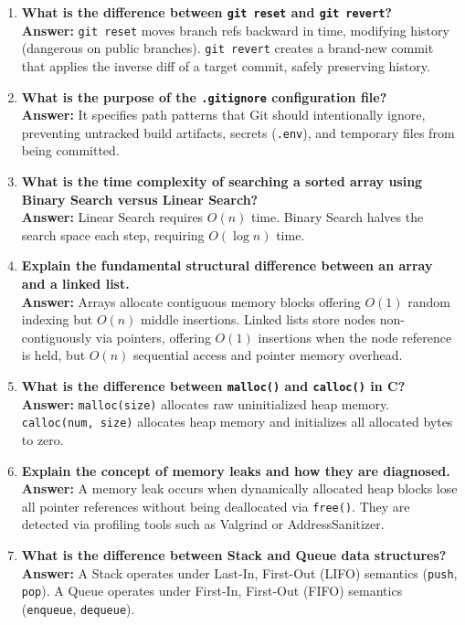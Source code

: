 \begin{enumerate}[leftmargin=*,label=\textbf{Q\arabic*.}]
    \item \textbf{What is the difference between \texttt{git reset} and \texttt{git revert}?} \\
    \textbf{Answer:} \texttt{git reset} moves branch refs backward in time, modifying history (dangerous on public branches). \texttt{git revert} creates a brand-new commit that applies the inverse diff of a target commit, safely preserving history.
    \item \textbf{What is the purpose of the \texttt{.gitignore} configuration file?} \\
    \textbf{Answer:} It specifies path patterns that Git should intentionally ignore, preventing untracked build artifacts, secrets (\texttt{.env}), and temporary files from being committed.
    \item \textbf{What is the time complexity of searching a sorted array using Binary Search versus Linear Search?} \\
    \textbf{Answer:} Linear Search requires $O(n)$ time. Binary Search halves the search space each step, requiring $O(\log n)$ time.
    \item \textbf{Explain the fundamental structural difference between an array and a linked list.} \\
    \textbf{Answer:} Arrays allocate contiguous memory blocks offering $O(1)$ random indexing but $O(n)$ middle insertions. Linked lists store nodes non-contiguously via pointers, offering $O(1)$ insertions when the node reference is held, but $O(n)$ sequential access and pointer memory overhead.
    \item \textbf{What is the difference between \texttt{malloc()} and \texttt{calloc()} in C?} \\
    \textbf{Answer:} \texttt{malloc(size)} allocates raw uninitialized heap memory. \texttt{calloc(num, size)} allocates heap memory and initializes all allocated bytes to zero.
    \item \textbf{Explain the concept of memory leaks and how they are diagnosed.} \\
    \textbf{Answer:} A memory leak occurs when dynamically allocated heap blocks lose all pointer references without being deallocated via \texttt{free()}. They are detected via profiling tools such as Valgrind or AddressSanitizer.
    \item \textbf{What is the difference between Stack and Queue data structures?} \\
    \textbf{Answer:} A Stack operates under Last-In, First-Out (LIFO) semantics (\texttt{push}, \texttt{pop}). A Queue operates under First-In, First-Out (FIFO) semantics (\texttt{enqueue}, \texttt{dequeue}).

\end{enumerate}
